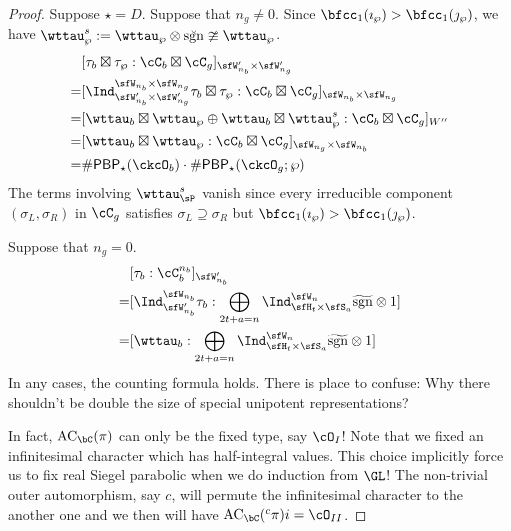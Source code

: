 \documentclass[12pt,a4paper]{amsart}
\newcommand{\AC}{\mathrm{AC}}
\newcommand{\sgn}{\operatorname{sgn}}
\numberwithin{equation}{section}
\theoremstyle{remark}
\def\brsgn{\breve{\sgn}}
\def\hsgn{\widetilde{\mathrm{sgn}}}
\def\PBP{\mathsf{PBP}}
\begin{document}
\begin{proof}
{    Suppose $\star = D$. Suppose that $n_{g}\neq 0$. Since
    $\bfcc_{1}(\imath_{\wp})>\bfcc_{1}(\jmath_{\wp})$, we have
    $\wttau^{s}_{\wp}:=\wttau_{\wp}\otimes \brsgn\ncong\wttau_{\wp}$.
    \[
      \begin{split}
        & [\tau_{b}\boxtimes \tau_{\wp} :
        \cC_{b} \boxtimes \cC_{g}]_{\sfW'_{n_{b}}\times \sfW'_{n_{g}}}\\
        = & [\Ind_{\sfW'_{n_{b}}\times \sfW'_{n_{g}}}^{\sfW_{n_{b}}\times \sfW_{n_{g}}} \tau_{b}\boxtimes \tau_{\wp} :
        \cC_{b} \boxtimes \cC_{g}]_{\sfW_{n_{b}}\times \sfW_{n_{g}}}\\
        = & [\wttau_{b}\boxtimes \wttau_{\wp}\oplus \wttau_{b}\boxtimes \wttau_{\wp}^{s}:
        \cC_{b} \boxtimes \cC_{g}]_{W''}\\
        = & [\wttau_{b}\boxtimes \wttau_{\wp}:
        \cC_{b} \boxtimes \cC_{g}]_{\sfW_{n_{g}}\times \sfW_{n_{b}}}\\
        =& \# \PBP_{\star}(\ckcO_{b})\cdot \# \PBP_{\star}(\ckcO_{g};\wp)
      \end{split}
    \]
    The terms involving $\wttau_{\sP}^{s}$ vanish since every irreducible
    component $(\sigma_{L},\sigma_{R})$ in $\cC_{g}$ satisfies
    $\sigma_{L}\supseteq \sigma_{R}$ but
    $\bfcc_{1}(\imath_{\wp})>\bfcc_{1}(\jmath_{\wp})$.

    Suppose that $n_{g} = 0$.
    \[
      \begin{split}
        & [\tau_{b} : \cC_{b}^{n_{b}}]_{\sfW'_{n_{b}}}\\
        =& [\Ind_{\sfW'_{n_{b}}}^{\sfW_{n_{b}}} \tau_{b} : \bigoplus_{\substack{2t+a=n}}
        \Ind_{\sfH_{t}\times \sfS_{a}}^{\sfW_{n}} \hsgn\otimes 1] \\
        =& [ \wttau_{b} : \bigoplus_{\substack{2t+a=n}}
        \Ind_{\sfH_{t}\times \sfS_{a}}^{\sfW_{n}} \hsgn\otimes 1] \\
      \end{split}
    \]
    In any cases, the counting formula holds. There is place to confuse: Why
    there shouldn't be double the size of special unipotent representations?

    In fact, $\AC_{\bC}(\pi)$ can only be the fixed type, say $\cO_{I}$! Note
    that we fixed an infinitesimal character which has half-integral values.
    This choice implicitly force us to fix real Siegel parabolic when we do
    induction from $\GL$! The non-trivial outer automorphism, say $c$, will
    permute the infinitesimal character to the another one and we then will have
    $\AC_{\bC}({}^{c}\pi)i = \cO_{II}$.


}
\end{proof}
\end{document}

